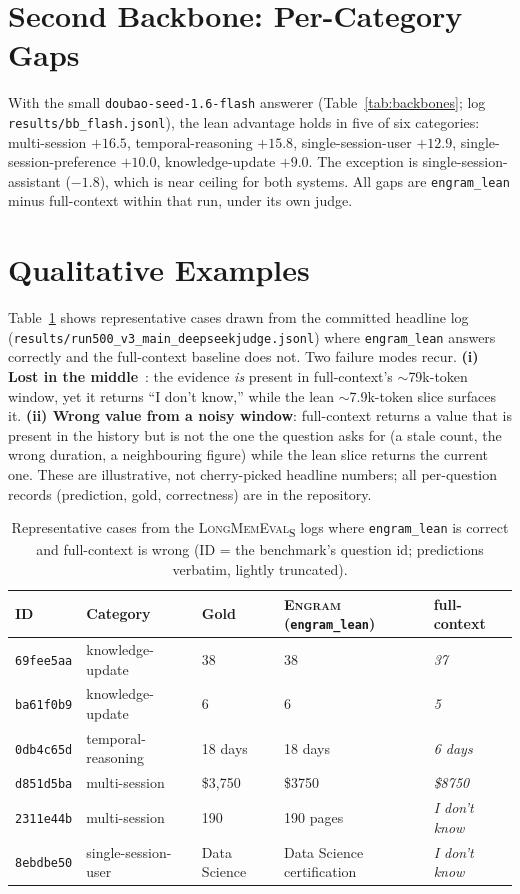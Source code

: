 \documentclass{article}
\newcommand{\engram}{\textsc{Engram}}
\newcommand{\lean}{\texttt{engram\_lean}}
\begin{document}
\section{Second Backbone: Per-Category Gaps}
\label{app:flash}

With the small \texttt{doubao-seed-1.6-flash} answerer (Table~\ref{tab:backbones}; log
\texttt{results/bb\_flash.jsonl}), the lean advantage holds in five of six categories: multi-session
$+16.5$, temporal-reasoning $+15.8$, single-session-user $+12.9$, single-session-preference $+10.0$,
knowledge-update $+9.0$. The exception is single-session-assistant ($-1.8$), which is near ceiling for both
systems. All gaps are \lean{} minus full-context within that run, under its own judge.

\section{Qualitative Examples}
\label{app:examples}

Table~\ref{tab:qual} shows representative cases drawn from the committed headline log
(\texttt{results/run500\_v3\_main\_deepseekjudge.jsonl}) where \lean{} answers correctly and the
full-context baseline does not. Two failure modes recur. \textbf{(i) Lost in the
middle}~\citep{liu2024lost}: the evidence \emph{is} present in full-context's $\sim$79k-token window, yet
it returns ``I don't know,'' while the lean $\sim$7.9k-token slice surfaces it. \textbf{(ii) Wrong value
from a noisy window}: full-context returns a value that is present in the history but is not the one the
question asks for (a stale count, the wrong duration, a neighbouring figure) while the lean slice returns
the current one. These are illustrative, not cherry-picked headline numbers; all per-question records
(prediction, gold, correctness) are in the repository.

\begin{table}[h]
\centering
\footnotesize
\caption{Representative cases from the \textsc{LongMemEval}\textsubscript{S} logs where \lean{} is correct
and full-context is wrong (ID = the benchmark's question id; predictions verbatim, lightly truncated).}
\label{tab:qual}
\begin{tabular}{@{}l p{2.0cm} p{1.9cm} p{2.7cm} p{2.7cm}@{}}
\toprule
ID & Category & Gold & \engram{} (\lean{}) & full-context \\
\midrule
\texttt{69fee5aa} & knowledge-update & 38 & 38 & \emph{37} \\
\texttt{ba61f0b9} & knowledge-update & 6 & 6 & \emph{5} \\
\texttt{0db4c65d} & temporal-reasoning & 18 days & 18 days & \emph{6 days} \\
\texttt{d851d5ba} & multi-session & \$3,750 & \$3750 & \emph{\$8750} \\
\texttt{2311e44b} & multi-session & 190 & 190 pages & \emph{I don't know} \\
\texttt{8ebdbe50} & single-session-user & Data Science & Data Science certification & \emph{I don't know} \\
\bottomrule
\end{tabular}
\end{table}
\end{document}
